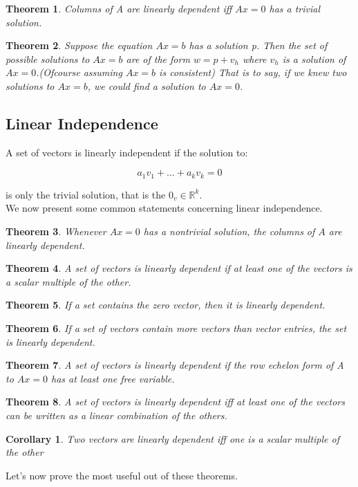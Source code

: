 \documentclass[titlepage]{article}
\newtheorem{thm}{Theorem}[subsection]
\newtheorem{cor}{Corollary}[subsection]
\numberwithin{equation}{subsection}
\begin{document}
\begin{thm}
Columns of A are linearly dependent iff $Ax=0$ has a trivial solution.
\end{thm}

\begin{thm}
Suppose the equation $Ax=b$ has a solution p. Then the set of possible solutions to $Ax=b$ are of the form $w = p + v_{h}$ where $v_{h}$ is a solution of $Ax = 0$.(Ofcourse assuming $Ax=b$ is consistent) That is to say, if we knew two solutions to $Ax=b$, we could find a solution to $Ax=0$. 
\end{thm}


\subsection{Linear Independence}
A set of vectors is linearly independent if the solution to:

\begin{equation*}
    a_{1}v_{1} + \ldots + a_{k}v_{k} = 0
\end{equation*}

is only the trivial solution, that is the $0_{v} \in \mathbb{R}^{k}$.
\\
We now present some common statements concerning linear independence. 
\begin{tcolorbox}
  \begin{thm}
    Whenever $Ax=0$ has a nontrivial solution, the columns of $A$ are linearly dependent. 
    \end{thm}
    
    \begin{thm}
    A set of vectors is linearly dependent if at least one of the vectors is a scalar multiple of the other.
    \end{thm}
    
    \begin{thm}
    If a set contains the zero vector, then it is linearly dependent.
    \end{thm}
    
    \begin{thm}
    If a set of vectors contain more vectors than vector entries, the set is linearly dependent.
    \end{thm}
    
    \begin{thm}
    A set of vectors is linearly dependent if the row echelon form of A to $Ax=0$ has at least one free variable.
    \end{thm}
    
\begin{thm}
\label{comb}
A set of vectors is linearly dependent iff at least one of the vectors can be written as a linear combination of the others.
\end{thm}

\begin{cor}
Two vectors are linearly dependent iff one is a scalar multiple of the other
\end{cor}

\end{tcolorbox}
Let's now prove the most useful out of these theorems. 
\end{document}
